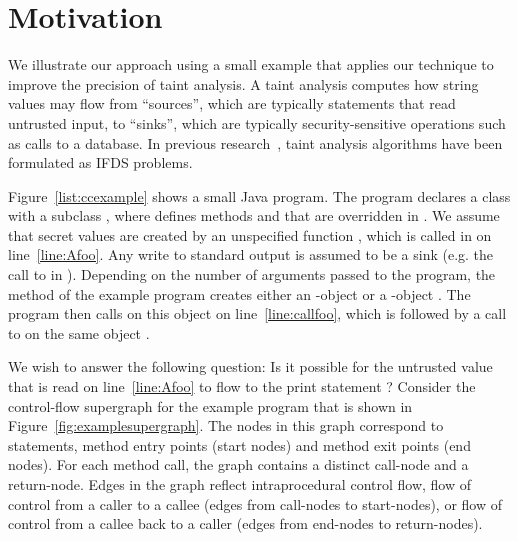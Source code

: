 \section{Motivation}
  \label{sec:MotivatingExample}
  
We illustrate our approach using a small example that
applies our technique to improve the precision of taint analysis.
A taint analysis computes how string values
may flow from ``sources'', which are typically statements that read untrusted input, 
to ``sinks'', which are typically security-sensitive
operations such as calls to 
a database. In previous research~\cite{DBLP:conf/issta/GuarnieriPTDTB11,DBLP:conf/pldi/ArztRFBBKTOM14}, 
taint analysis algorithms have been formulated as IFDS problems.     



Figure~\ref{list:ccexample} shows a small Java program.
The program
declares a class  with a subclass ,  where  defines methods 
 and  that are overridden in .  
We assume  that secret values are created by 
an unspecified function , which is called in  on 
line~\ref{line:Afoo}. 
Any write to standard output 
is assumed to be a sink (e.g. the call to  in ).
Depending on the number of 
arguments passed to the program, the  method of the example program creates 
either an -object or a -object%
. The 
program then calls  on this object
on line~\ref{line:callfoo}, which is 
followed by a call to  on the same object%
.  

 
We wish to answer the following question: Is it possible for the untrusted value 
that is read on line~\ref{line:Afoo} to flow to the print statement%
?
Consider the control-flow
supergraph for the example program that is shown in Figure~\ref{fig:examplesupergraph}.
 The nodes in this graph correspond to statements, method entry points (start nodes) and 
method exit points (end nodes). For each method call, the graph contains a 
distinct call-node and a return-node. Edges in the graph reflect intraprocedural control flow, 
flow of control from a caller to a callee (edges from call-nodes to start-nodes), or
flow of control from a callee back to a caller (edges from end-nodes to return-nodes). 

